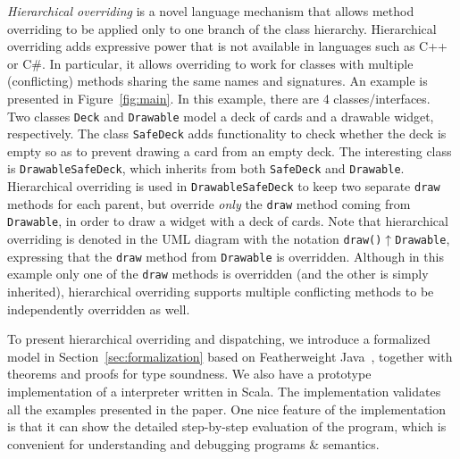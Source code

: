 \textit{Hierarchical overriding} is a novel language
mechanism that allows method overriding to be applied
only to one branch of the class hierarchy. Hierarchical overriding 
adds expressive power that is not available in languages such as 
C++ or C\#. In particular, it allows overriding to work 
for classes with multiple (conflicting) methods sharing the 
same names and signatures. An example is presented in 
Figure~\ref{fig:main}. In this example, there are 4 classes/interfaces.
Two classes \lstinline|Deck| and \lstinline|Drawable| model a deck of cards
 and a drawable widget, respectively. 
The class \lstinline|SafeDeck| adds functionality to check whether the
deck is empty so as to prevent drawing a card from an empty deck. 
The interesting class is \lstinline|DrawableSafeDeck|, which inherits 
from both \lstinline|SafeDeck| and \lstinline|Drawable|. Hierarchical
overriding is used in \lstinline|DrawableSafeDeck| to keep two separate \lstinline|draw|
methods for each parent, but override \emph{only} the \lstinline|draw|
method coming from \lstinline|Drawable|, in order to draw a widget
with a deck of cards. Note that hierarchical overriding is denoted in the UML
diagram with the notation
\lstinline|draw()|$\uparrow$\lstinline|Drawable|, expressing that the \lstinline|draw| method from \lstinline|Drawable|
is overridden. Although in this example only one of the
\lstinline|draw| methods is overridden (and the other is simply inherited), hierarchical overriding
supports multiple conflicting methods to be independently overridden as well.

To present hierarchical overriding and dispatching, we introduce a
formalized model \MIM{} in Section~\ref{sec:formalization} based on
Featherweight Java~\cite{Igarashi01FJ}, together with theorems and
proofs for type soundness. We also have a prototype implementation of
a \name{} interpreter written in Scala. The implementation validates
all the examples presented in the paper. 
One nice feature of the implementation is that it can show the
detailed step-by-step evaluation of the program, which is convenient
for understanding and debugging programs \& semantics. 

